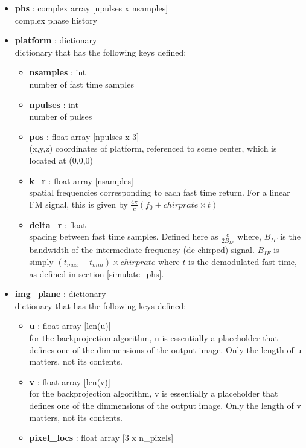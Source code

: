 \documentclass{article}
\newcommand{\defs}[2]{\textbf{{#1}} : {#2}}
\begin{document}
\begin{itemize}
	\item \defs{phs}{complex array [npulses x nsamples]}\\
  	complex phase history
  	\item \defs{platform}{dictionary}\\
  	dictionary that has the following keys defined:
	\begin{itemize}
    	\item \defs{nsamples}{int}\\
    		number of fast time samples
	    \item \defs{npulses}{int}\\
	    	number of pulses
	    \item \defs{pos}{float array [npulses x 3]}\\
	       	(x,y,z) coordinates of platform, referenced to scene center, which is located at (0,0,0)
		\item\defs{k\_r}{float array [nsamples]}\\
	    	spatial frequencies corresponding to each fast time return.  For a linear FM signal, this is given by $\frac{4\pi}{c}(f_0+chirprate\times t)$
    	\item \defs{delta\_r}{float}\\
    	   	spacing between fast time samples.  Defined here as $\frac{c}{2B_{IF}}$ where, $B_{IF}$ is the bandwidth of the intermediate frequency (de-chirped) signal.  $B_{IF}$ is simply $(t_{max}-t_{min})\times chirprate$ where $t$ is the demodulated fast time, as defined in section \ref{simulate_phs}.
	\end{itemize}
  	\item \defs{img\_plane}{dictionary}\\
  	dictionary that has the following keys defined:
	\begin{itemize}
	    \item \defs{u}{float array [len(u)]}\\
	    	for the backprojection algorithm, u is essentially a placeholder that defines one of the dimmensions of the output image.  Only the length of u matters, not its contents.
	    \item \defs{v}{float array [len(v)]}\\
	    	for the backprojection algorithm, v is essentially a placeholder that defines one of the dimmensions of the output image.  Only the length of v matters, not its contents.
	    \item \defs{pixel\_locs}{float array [3 x n\_pixels]}\\

\end{itemize}
\end{itemize}
\end{document}
